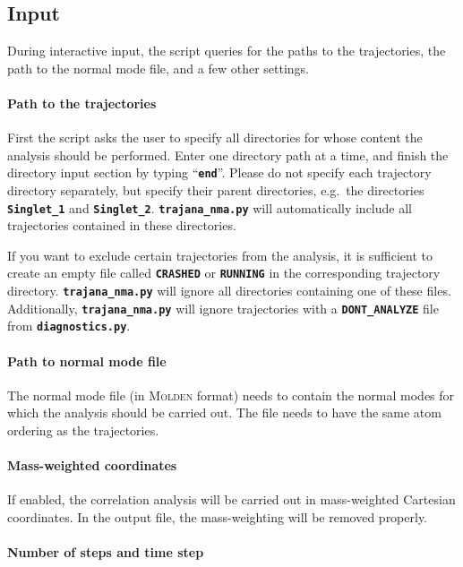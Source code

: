 \documentclass[a4paper,10pt,DIV=15,openany]{scrbook}
\newcommand{\ttt}[1]{\textbf{\texttt{#1}}}
\begin{document}
\subsection{Input}

During interactive input, the script queries for the paths to the trajectories, the path to the normal mode file, and a few other settings.

\paragraph{Path to the trajectories}

First the script asks the user to specify all directories for whose content the analysis should be performed. Enter one directory path at a time, and finish the directory input section by typing ``\ttt{end}''. Please do not specify each trajectory directory separately, but specify their parent directories, e.g.\ the directories \ttt{Singlet\_1} and \ttt{Singlet\_2}. \ttt{trajana\_nma.py} will automatically include all trajectories contained in these directories.

If you want to exclude certain trajectories from the analysis, it is sufficient to create an empty file called \ttt{CRASHED} or \ttt{RUNNING} in the corresponding trajectory directory. \ttt{trajana\_nma.py} will ignore all directories containing one of these files.
Additionally, \ttt{trajana\_nma.py} will ignore trajectories with a \ttt{DONT\_ANALYZE} file from \ttt{diagnostics.py}.

\paragraph{Path to normal mode file}

The normal mode file (in \textsc{Molden} format) needs to contain the normal modes for which the analysis should be carried out.
The file needs to have the same atom ordering as the trajectories.

\paragraph{Mass-weighted coordinates}

If enabled, the correlation analysis will be carried out in mass-weighted Cartesian coordinates.
In the output file, the mass-weighting will be removed properly.

\paragraph{Number of steps and time step}
\end{document}
